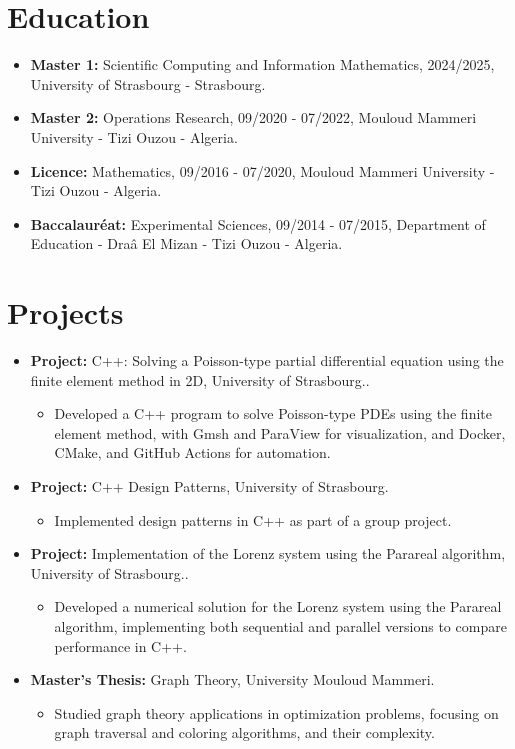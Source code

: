 \documentclass[a4paper,10pt]{article}
\begin{document}
\section*{Education}
\begin{itemize}[leftmargin=*]
    \item \textbf{Master 1:} Scientific Computing and Information Mathematics, 2024/2025, University of Strasbourg - Strasbourg.
    \item \textbf{Master 2:} Operations Research, 09/2020 - 07/2022, Mouloud Mammeri University - Tizi Ouzou - Algeria.
    \item \textbf{Licence:} Mathematics, 09/2016 - 07/2020, Mouloud Mammeri University - Tizi Ouzou - Algeria.
    \item \textbf{Baccalauréat:} Experimental Sciences, 09/2014 - 07/2015, Department of Education - Draâ El Mizan - Tizi Ouzou - Algeria.
\end{itemize}


\section*{Projects}
\begin{itemize}[leftmargin=*]
    \item \textbf{Project:} C++: Solving a Poisson-type partial differential equation using the finite element method in 2D, University of Strasbourg..
    \begin{itemize}
        \item Developed a C++ program to solve Poisson-type PDEs using the finite element method, with Gmsh and ParaView for visualization, and Docker, CMake, and GitHub Actions for automation.
    \end{itemize}

    \item \textbf{Project:} C++ Design Patterns, University of Strasbourg.
    \begin{itemize}
        \item Implemented design patterns in C++ as part of a group project.
    \end{itemize}

    \item \textbf{Project:} Implementation of the Lorenz system using the Parareal algorithm, University of Strasbourg..
    \begin{itemize}
        \item Developed a numerical solution for the Lorenz system using the Parareal algorithm, implementing both sequential and parallel versions to compare performance in C++.
    \end{itemize}
    
    \item \textbf{Master's Thesis:} Graph Theory, University Mouloud Mammeri.
    \begin{itemize}
        \item Studied graph theory applications in optimization problems, focusing on graph traversal and coloring algorithms, and their complexity.
    \end{itemize} 
\end{itemize}
\end{document}
